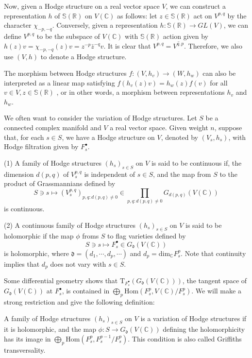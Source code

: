 Now, given a Hodge structure on a real vector space $V$, we can construct a representation $h$ of $\mathbb S(\mathbb R)$ on $V(\mathbb C)$ as follows: let $z\in \mathbb S(\mathbb R)$ act on $V^{p,q}$ by the character $\chi_{-p,-q}$. Conversely, given a representation $h:\mathbb S(\mathbb R) \to GL(V)$, we can define $V^{p,q}$ to be the subspace of $V(\mathbb C)$ with $\mathbb S(\mathbb R)$ action given by $h(z)v=\chi_{-p,-q}(z)v=z^{-p}\bar z^{-q} v$. It is clear that $V^{p,q}=\overline{V^{q,p}}$. Therefore, we also use $(V,h)$ to denote a Hodge structure.

The morphism between Hodge structures $f:(V,h_v)\to (W,h_w)$ can also be interpreted as a linear map satisfying $f(h_v(z)v)=h_w(z)f(v)$ for all $v \in V, z\in \mathbb S(\mathbb R) $ , or in other words, a morphism between representations $h_v$ and $h_w$. 

We often want to consider the variation of Hodge structures. Let $S$ be a connected complex manifold and $V$ a real vector space. Given weight $n$, suppose that, for each $s\in S$, we have a Hodge structure on $V$, denoted by $(V_s,h_s)$, with Hodge filtration given by $F_s^\bullet$. 

\begin{definition}
 \label{definition-continuity-and-holomorphicity}
 (1) A family of Hodge structures $(h_s)_{s \in S}$ on $V$ is said to be continuous if, the dimension $d(p,q)$ of $V_s^{p,q}$ is independent of $s\in S$, and the map from $S$ to the product of Grassmannians defined by
$$
S \ni s  \mapsto (V_s^{p,q})_{p,q:d(p,q)\ne 0} \in \prod_{p,q:d(p,q)\ne0}G_{d(p,q)}(V(\mathbb C))
$$
is continuous.

(2) A continuous family of Hodge structures $(h_s)_{s \in S}$ on $V$ is said to be holomorphic if the map $\phi$ froms $S$ to flag varieties defined by
$$
S \ni s \mapsto F_s ^\bullet \in G_\mathfrak d (V(\mathbb C))
$$
is holomorphic, where $\mathfrak d= (d_1,\cdots,d_p,\cdots)$ and $d_p=\text{dim}_\mathbb C F^p_s $. Note that continuity implies that $d_p$ does not vary with $s\in S$.
\end{definition}

Some differential geometry shows that $\text{T}_{F_s^\bullet}(G_\mathfrak d (V(\mathbb C)))$, the tangent space of $G_\mathfrak d (V(\mathbb C))$ at $F_s^\bullet$, is contained in $\bigoplus _p \text{Hom}(F_s^p ,V(\mathbb C)/F_s^p)$. We will make a strong restriction and give the following definition:

\begin{definition}
 \label{definition-variation-of-Hodge-structures}
 A family of Hodge structures $(h_s)_{s \in S}$ on $V$ is a variation of Hodge structures if it is holomorphic,  and the map $\phi:S \to G_\mathfrak d (V(\mathbb C))$ defining the holomorphicity has its image in $\bigoplus _p \text{Hom}(F_s^p ,F_s^{p-1}/F_s^p)$. This condition is also called Griffiths transversality.
\end{definition}

